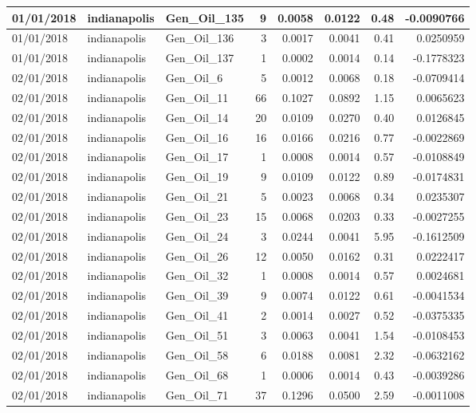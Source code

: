 \documentclass[
  letterpaper,
  DIV=11,
  numbers=noendperiod]{scrartcl}
\begin{document}
\begin{tabular}{l|l|l|r|r|r|r|r}
\hline
01/01/2018 & indianapolis & Gen\_Oil\_135 & 9 & 0.0058 & 0.0122 & 0.48 & -0.0090766\\
\hline
01/01/2018 & indianapolis & Gen\_Oil\_136 & 3 & 0.0017 & 0.0041 & 0.41 & 0.0250959\\
\hline
01/01/2018 & indianapolis & Gen\_Oil\_137 & 1 & 0.0002 & 0.0014 & 0.14 & -0.1778323\\
\hline
02/01/2018 & indianapolis & Gen\_Oil\_6 & 5 & 0.0012 & 0.0068 & 0.18 & -0.0709414\\
\hline
02/01/2018 & indianapolis & Gen\_Oil\_11 & 66 & 0.1027 & 0.0892 & 1.15 & 0.0065623\\
\hline
02/01/2018 & indianapolis & Gen\_Oil\_14 & 20 & 0.0109 & 0.0270 & 0.40 & 0.0126845\\
\hline
02/01/2018 & indianapolis & Gen\_Oil\_16 & 16 & 0.0166 & 0.0216 & 0.77 & -0.0022869\\
\hline
02/01/2018 & indianapolis & Gen\_Oil\_17 & 1 & 0.0008 & 0.0014 & 0.57 & -0.0108849\\
\hline
02/01/2018 & indianapolis & Gen\_Oil\_19 & 9 & 0.0109 & 0.0122 & 0.89 & -0.0174831\\
\hline
02/01/2018 & indianapolis & Gen\_Oil\_21 & 5 & 0.0023 & 0.0068 & 0.34 & 0.0235307\\
\hline
02/01/2018 & indianapolis & Gen\_Oil\_23 & 15 & 0.0068 & 0.0203 & 0.33 & -0.0027255\\
\hline
02/01/2018 & indianapolis & Gen\_Oil\_24 & 3 & 0.0244 & 0.0041 & 5.95 & -0.1612509\\
\hline
02/01/2018 & indianapolis & Gen\_Oil\_26 & 12 & 0.0050 & 0.0162 & 0.31 & 0.0222417\\
\hline
02/01/2018 & indianapolis & Gen\_Oil\_32 & 1 & 0.0008 & 0.0014 & 0.57 & 0.0024681\\
\hline
02/01/2018 & indianapolis & Gen\_Oil\_39 & 9 & 0.0074 & 0.0122 & 0.61 & -0.0041534\\
\hline
02/01/2018 & indianapolis & Gen\_Oil\_41 & 2 & 0.0014 & 0.0027 & 0.52 & -0.0375335\\
\hline
02/01/2018 & indianapolis & Gen\_Oil\_51 & 3 & 0.0063 & 0.0041 & 1.54 & -0.0108453\\
\hline
02/01/2018 & indianapolis & Gen\_Oil\_58 & 6 & 0.0188 & 0.0081 & 2.32 & -0.0632162\\
\hline
02/01/2018 & indianapolis & Gen\_Oil\_68 & 1 & 0.0006 & 0.0014 & 0.43 & -0.0039286\\
\hline
02/01/2018 & indianapolis & Gen\_Oil\_71 & 37 & 0.1296 & 0.0500 & 2.59 & -0.0011008\\

\end{tabular}
\end{document}
